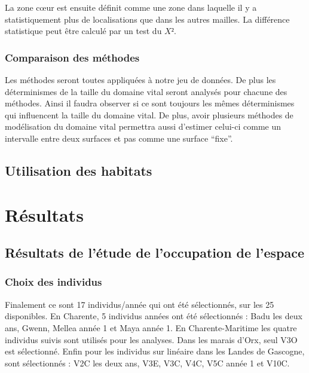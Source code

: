 \documentclass[
  letterpaper,
  DIV=11,
  numbers=noendperiod]{scrreprt}
\begin{document}
La zone cœur est ensuite définit comme une zone dans laquelle il y a
statistiquement plus de localisations que dans les autres mailles. La
différence statistique peut être calculé par un test du \(X²\).

\section{Comparaison des méthodes}\label{comparaison-des-muxe9thodes}

Les méthodes seront toutes appliquées à notre jeu de données. De plus
les déterminismes de la taille du domaine vital seront analysés pour
chacune des méthodes. Ainsi il faudra observer si ce sont toujours les
mêmes déterminismes qui influencent la taille du domaine vital. De plus,
avoir plusieurs méthodes de modélisation du domaine vital permettra
aussi d'estimer celui-ci comme un intervalle entre deux surfaces et pas
comme une surface ``fixe''.

\chapter{Utilisation des habitats}\label{utilisation-des-habitats}

\part{Résultats}

\chapter{Résultats de l'étude de l'occupation de
l'espace}\label{ruxe9sultats-de-luxe9tude-de-loccupation-de-lespace}

\section{Choix des individus}\label{choix-des-individus-1}

Finalement ce sont 17 individus/année qui ont été sélectionnés, sur les
25 disponibles. En Charente, 5 individus années ont été sélectionnés :
Badu les deux ans, Gwenn, Mellea année 1 et Maya année 1. En
Charente-Maritime les quatre individus suivis sont utilisés pour les
analyses. Dans les marais d'Orx, seul V3O est sélectionné. Enfin pour
les individus sur linéaire dans les Landes de Gascogne, sont
sélectionnés : V2C les deux ans, V3E, V3C, V4C, V5C année 1 et V10C.

\end{document}
